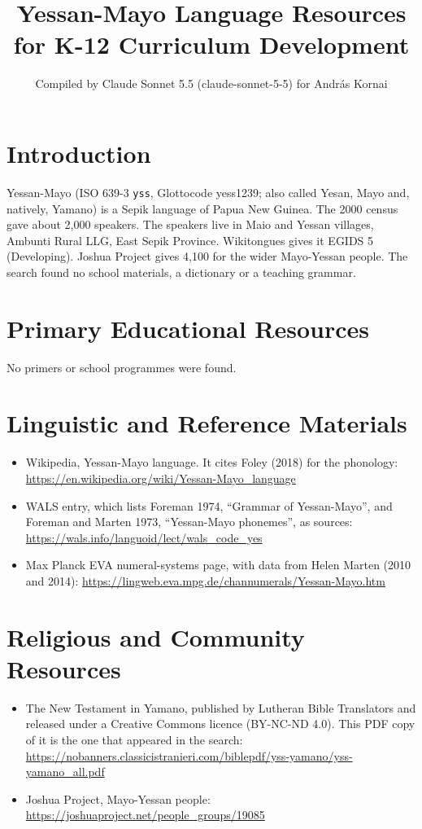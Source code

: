 \documentclass[12pt]{article}
\title{Yessan-Mayo Language Resources for K-12 Curriculum Development}
\author{Compiled by Claude Sonnet 5.5 (claude-sonnet-5-5) for Andr\'as Kornai}
\date{}
\begin{document}
\maketitle

\section{Introduction}
Yessan-Mayo (ISO 639-3 \texttt{yss}, Glottocode yess1239; also called Yesan, Mayo and, natively, Yamano) is a Sepik language of Papua New Guinea. The 2000 census gave about 2,000 speakers. The speakers live in Maio and Yessan villages, Ambunti Rural LLG, East Sepik Province. Wikitongues gives it EGIDS 5 (Developing). Joshua Project gives 4,100 for the wider Mayo-Yessan people. The search found no school materials, a dictionary or a teaching grammar.

\section{Primary Educational Resources}
No primers or school programmes were found.

\section{Linguistic and Reference Materials}
\begin{itemize}
\item Wikipedia, Yessan-Mayo language. It cites Foley (2018) for the phonology: \url{https://en.wikipedia.org/wiki/Yessan-Mayo_language}
\item WALS entry, which lists Foreman 1974, ``Grammar of Yessan-Mayo'', and Foreman and Marten 1973, ``Yessan-Mayo phonemes'', as sources: \url{https://wals.info/languoid/lect/wals_code_yes}
\item Max Planck EVA numeral-systems page, with data from Helen Marten (2010 and 2014): \url{https://lingweb.eva.mpg.de/channumerals/Yessan-Mayo.htm}
\end{itemize}

\section{Religious and Community Resources}
\begin{itemize}
\item The New Testament in Yamano, published by Lutheran Bible Translators and released under a Creative Commons licence (BY-NC-ND 4.0). This PDF copy of it is the one that appeared in the search: \url{https://nobanners.classicistranieri.com/biblepdf/yss-yamano/yss-yamano_all.pdf}
\item Joshua Project, Mayo-Yessan people: \url{https://joshuaproject.net/people_groups/19085}
\end{itemize}
\end{document}
